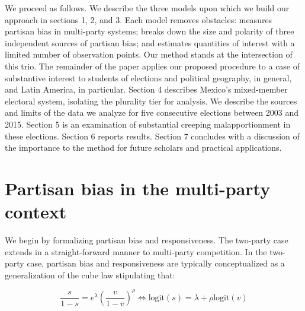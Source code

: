 \documentclass[letter,12pt]{article}
\begin{document}

We proceed as follows. We describe the three models upon which we build our approach in sections 1, 2, and 3. Each model removes obstacles: \citet{king.1990elRespBiasMultiparty} measures partisan bias in multi-party systems; \citet{grofman.etalBiasMalapp.1997} breaks down the size and polarity of three independent sources of partisan bias; and \citet{linzerSeatVoteElasticity2012} estimates quantities of interest with a limited number of observation points. Our method stands at the intersection of this trio. The remainder of the paper applies our proposed procedure to a case of substantive interest to students of elections and political geography, in general, and Latin America, in particular. Section 4 describes Mexico's mixed-member electoral system, isolating the plurality tier for analysis. We describe the sources and limits of the data we analyze for five consecutive elections between 2003 and 2015. Section 5 is an examination of substantial creeping malapportionment in these elections. Section 6 reports results. Section 7 concludes with a discussion of the importance to the method for future scholars and practical applications. 

\section{Partisan bias in the multi-party context}\label{S:bias}

We begin by formalizing partisan bias and responsiveness. The two-party case \citep{taagepera.CubeLaw.1973,tufte1973seatsVotes,king.browning1987biasRespUS} extends in a straight-forward manner to multi-party competition. In the two-party case, partisan bias and responsiveness are typically conceptualized as a generalization of the cube law stipulating that:

\begin{equation}\label{E:kingBi}
 \frac{s}{1-s} = e^\lambda  \left(\frac{v}{1-v}\right)^\rho \iff
 \text{logit}(s) = \lambda + \rho  \text{logit}(v)
\end{equation}\label{E:cubeLaw}
\end{document}
